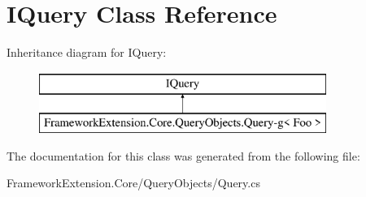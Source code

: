 \hypertarget{class_i_query-g}{\section{I\-Query Class Reference}
\label{class_i_query-g}
}
Inheritance diagram for I\-Query\-:\begin{figure}[H]
\begin{center}
\leavevmode
\includegraphics[height=2.000000cm]{class_i_query-g}
\end{center}
\end{figure}


The documentation for this class was generated from the following file\-:\begin{DoxyCompactItemize}
\item 
Framework\-Extension.\-Core/\-Query\-Objects/Query.\-cs\end{DoxyCompactItemize}
